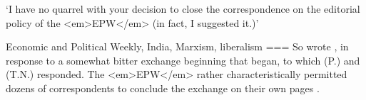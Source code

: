‘I have no quarrel with your decision to close the correspondence on the editorial policy of the <em>EPW</em> (in fact, I suggested it.)’

Economic and Political Weekly, India, Marxism, liberalism
===
So wrote \textcite{kumar1991a}, in response to a somewhat bitter exchange beginning that \textcite{kumar1991} began, to which (P.) \textcite{radhakrishnan1991} and (T.N.) \textcite{srinivasan1991} responded. The <em>EPW</em> rather characteristically permitted dozens of correspondents to conclude the exchange on their own pages \parencite{chandra1991}.